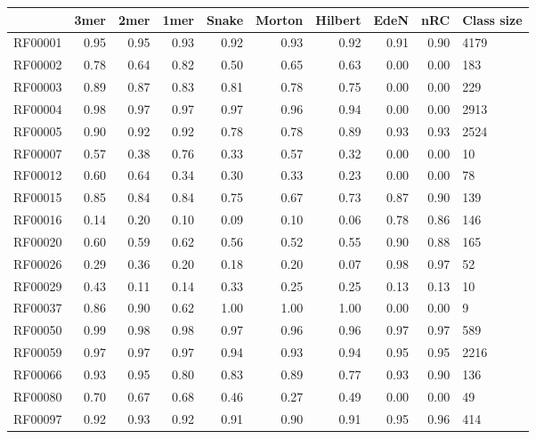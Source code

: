 \begin{tabular}{lrrrrrrrrl}
\toprule
{} &  3mer &  2mer &  1mer &  Snake &  Morton &  Hilbert &  EdeN &  nRC & Class size \\
\midrule
RF00001      &  0.95 &  0.95 &  0.93 &   0.92 &    0.93 &     0.92 &  0.91 & 0.90 &       4179 \\
RF00002      &  0.78 &  0.64 &  0.82 &   0.50 &    0.65 &     0.63 &  0.00 & 0.00 &        183 \\
RF00003      &  0.89 &  0.87 &  0.83 &   0.81 &    0.78 &     0.75 &  0.00 & 0.00 &        229 \\
RF00004      &  0.98 &  0.97 &  0.97 &   0.97 &    0.96 &     0.94 &  0.00 & 0.00 &       2913 \\
RF00005      &  0.90 &  0.92 &  0.92 &   0.78 &    0.78 &     0.89 &  0.93 & 0.93 &       2524 \\
RF00007      &  0.57 &  0.38 &  0.76 &   0.33 &    0.57 &     0.32 &  0.00 & 0.00 &         10 \\
RF00012      &  0.60 &  0.64 &  0.34 &   0.30 &    0.33 &     0.23 &  0.00 & 0.00 &         78 \\
RF00015      &  0.85 &  0.84 &  0.84 &   0.75 &    0.67 &     0.73 &  0.87 & 0.90 &        139 \\
RF00016      &  0.14 &  0.20 &  0.10 &   0.09 &    0.10 &     0.06 &  0.78 & 0.86 &        146 \\
RF00020      &  0.60 &  0.59 &  0.62 &   0.56 &    0.52 &     0.55 &  0.90 & 0.88 &        165 \\
RF00026      &  0.29 &  0.36 &  0.20 &   0.18 &    0.20 &     0.07 &  0.98 & 0.97 &         52 \\
RF00029      &  0.43 &  0.11 &  0.14 &   0.33 &    0.25 &     0.25 &  0.13 & 0.13 &         10 \\
RF00037      &  0.86 &  0.90 &  0.62 &   1.00 &    1.00 &     1.00 &  0.00 & 0.00 &          9 \\
RF00050      &  0.99 &  0.98 &  0.98 &   0.97 &    0.96 &     0.96 &  0.97 & 0.97 &        589 \\
RF00059      &  0.97 &  0.97 &  0.97 &   0.94 &    0.93 &     0.94 &  0.95 & 0.95 &       2216 \\
RF00066      &  0.93 &  0.95 &  0.80 &   0.83 &    0.89 &     0.77 &  0.93 & 0.90 &        136 \\
RF00080      &  0.70 &  0.67 &  0.68 &   0.46 &    0.27 &     0.49 &  0.00 & 0.00 &         49 \\
RF00097      &  0.92 &  0.93 &  0.92 &   0.91 &    0.90 &     0.91 &  0.95 & 0.96 &        414 \\

\end{tabular}
